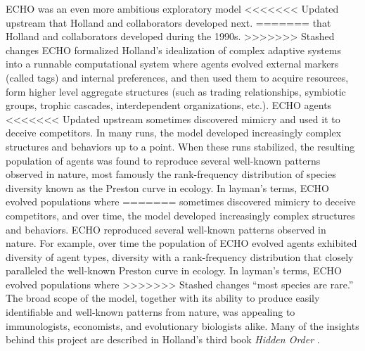 \documentclass{sig-alternate}
\begin{document}
ECHO \cite{Holland1999,Hraber1997} was an even more ambitious exploratory model
<<<<<<< Updated upstream
that Holland and collaborators developed next. 
=======
that Holland and collaborators developed during the 1990s. 
>>>>>>> Stashed changes
ECHO formalized Holland's idealization of complex adaptive systems into
a runnable computational system where agents evolved external markers
(called tags) and internal preferences, and then used them to acquire
resources, form higher
level aggregate structures (such as trading relationships, symbiotic groups,
trophic cascades, interdependent organizations, etc.).  ECHO agents
<<<<<<< Updated upstream
sometimes discovered mimicry and used it to deceive competitors.  
In many runs,  
the model developed increasingly complex structures and behaviors up
to a point.  When these runs stabilized, the resulting population of agents
was found to reproduce several well-known patterns 
observed in nature, most famously the rank-frequency distribution of
species diversity known as the Preston curve in ecology.
In layman's terms, ECHO evolved populations where 
=======
sometimes discovered mimicry to deceive competitors, and over time,
the model developed increasingly complex structures and behaviors.
ECHO reproduced several well-known patterns 
observed in nature.  For example, over time the population of ECHO
evolved agents exhibited diversity of agent types, diversity with a 
rank-frequency distribution that
closely paralleled the well-known Preston curve in ecology.  In
layman's terms, ECHO evolved populations where 
>>>>>>> Stashed changes
``most species are rare.''  
The broad scope of the model, together with its ability to produce
easily identifiable and well-known patterns from nature, was appealing to immunologists, economists, and evolutionary biologists alike.   Many
of the insights behind this project are described in Holland's third book \emph{Hidden Order} \cite{Holland1995}. 



\end{document}
